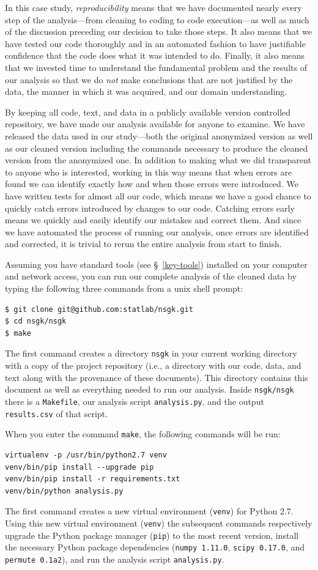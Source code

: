 \documentclass[]{article}
\begin{document}
In this case study, \emph{reproducibility} means that we have documented nearly
every step of the analysis---from cleaning to coding to code execution---as
well as much of the discussion preceding our decision to take those steps.
It also means that we have tested our code thoroughly and in an automated fashion 
to have justifiable confidence that the code does what it was intended
to do.
Finally, it also means that we invested time to understand the fundamental
problem and the results of our analysis so that we do \emph{not} make
conclusions that are not justified by the data, the manner in which it was
acquired, and our domain understanding.

By keeping all code, text, and data in a publicly available version
controlled repository, we have made our analysis available
for anyone to examine.
We have released the data used in our study---both the original anonymized
version as well as our cleaned version including the commands necessary
to produce the cleaned version from the anonymized one.
In addition to making what we did transparent to anyone who is interested,
working in this way means that when errors are found we can identify
exactly how and when those errors were introduced.
We have written tests for almost all our code, which means we have a good
chance to quickly catch errors introduced by changes to our code.
Catching errors early means we quickly and easily identify our mistakes and
correct them.
And since we have automated the process of running our analysis, once errors
are identified and corrected, it is trivial to rerun the entire analysis from
start to finish.

Assuming you have standard tools (see \S~\ref{key-tools}) installed on your
computer and network access, you can run our complete analysis of the cleaned
data by typing the following three commands from a unix shell prompt:
\begin{verbatim}
$ git clone git@github.com:statlab/nsgk.git
$ cd nsgk/nsgk
$ make
\end{verbatim}
The first command creates a directory \texttt{nsgk} in your current working
directory with a copy of the project repository (i.e., a directory with our
code, data, and text along with the provenance of these documents).
This directory contains this document as well as everything needed to run our
analysis.
Inside \texttt{nsgk/nsgk} there is a \texttt{Makefile}, our analysis script
\texttt{analysis.py}, and the output \texttt{results.csv} of that script.

When you enter the command \texttt{make}, the following commands will be run:
\begin{verbatim}
virtualenv -p /usr/bin/python2.7 venv
venv/bin/pip install --upgrade pip
venv/bin/pip install -r requirements.txt
venv/bin/python analysis.py
\end{verbatim}
The first command creates a new virtual environment (\texttt{venv}) for Python
2.7.
Using this new virtual environment (\texttt{venv}) the subsequent commands
respectively upgrade the Python package manager (\texttt{pip}) to the most
recent version, install the necessary Python package dependencies
(\texttt{numpy~1.11.0}, \texttt{scipy~0.17.0}, and \texttt{permute~0.1a2}),
and run the analysis script \texttt{analysis.py}.
\end{document}
